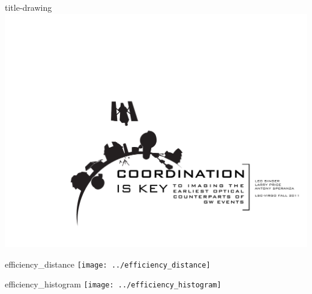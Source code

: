 \documentclass[portrait]{a0poster}
\begin{document}
\begin{staticcontents*}{title-drawing}
\includegraphics[width=\textwidth,clip=true,trim=0cm 5cm 0cm 0cm]{title-drawing.pdf}
\end{staticcontents*}

\begin{staticcontents*}{efficiency_distance}
\texttt{[image: ../efficiency\_distance]}
\end{staticcontents*}

\begin{staticcontents*}{efficiency_histogram}
\texttt{[image: ../efficiency\_histogram]}
\end{staticcontents*}
\end{document}
